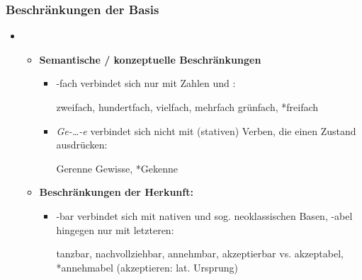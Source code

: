 \begin{frame}
\frametitle{Beschränkungen der Basis}

\begin{itemize}
	\item[]
	
	\begin{itemize}
		\item \textbf{Semantische / konzeptuelle Beschränkungen}
	
		\begin{itemize}
			\item -fach verbindet sich nur mit Zahlen und :
		
			\ea zweifach, hundertfach, vielfach, mehrfach \vs *grünfach, *freifach
			\z
		
			\item \textit{Ge-{\dots}-e} verbindet sich nicht mit (stativen) Verben, die einen Zustand ausdrücken:
		
			\ea Gerenne \vs *Gewisse, *Gekenne
			\z
			
		\end{itemize}
		
	\item \textbf{Beschränkungen der Herkunft:}
	
	\begin{itemize}
		\item -bar verbindet sich mit nativen und sog. neoklassischen Basen, -abel hingegen nur mit letzteren: 
		
		\ea tanzbar, nachvollziehbar, annehmbar, akzeptierbar vs. akzeptabel, *annehmabel (akzeptieren: lat. Ursprung)
		\z
		
		\end{itemize}
		
	\end{itemize}
	
\end{itemize}

\end{frame}



